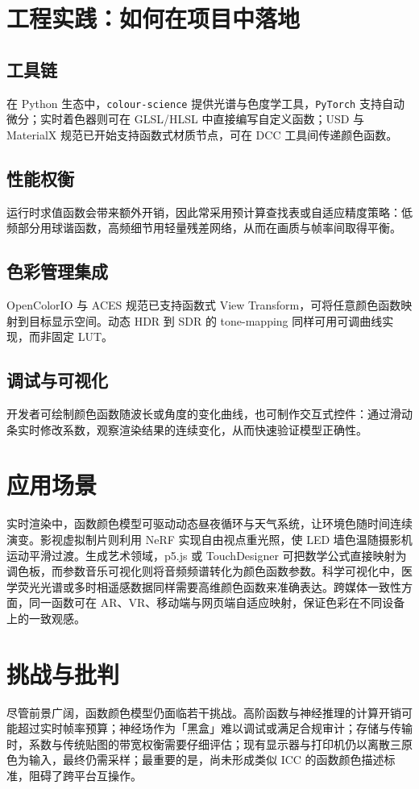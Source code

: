 \chapter{工程实践：如何在项目中落地}
\section{工具链}
在 Python 生态中，\texttt{colour-science} 提供光谱与色度学工具，\texttt{PyTorch} 支持自动微分；实时着色器则可在 GLSL/HLSL 中直接编写自定义函数；USD 与 MaterialX 规范已开始支持函数式材质节点，可在 DCC 工具间传递颜色函数。\par
\section{性能权衡}
运行时求值函数会带来额外开销，因此常采用预计算查找表或自适应精度策略：低频部分用球谐函数，高频细节用轻量残差网络，从而在画质与帧率间取得平衡。\par
\section{色彩管理集成}
OpenColorIO 与 ACES 规范已支持函数式 View Transform，可将任意颜色函数映射到目标显示空间。动态 HDR 到 SDR 的 tone-mapping 同样可用可调曲线实现，而非固定 LUT。\par
\section{调试与可视化}
开发者可绘制颜色函数随波长或角度的变化曲线，也可制作交互式控件：通过滑动条实时修改系数，观察渲染结果的连续变化，从而快速验证模型正确性。\par
\chapter{应用场景}
实时渲染中，函数颜色模型可驱动动态昼夜循环与天气系统，让环境色随时间连续演变。影视虚拟制片则利用 NeRF 实现自由视点重光照，使 LED 墙色温随摄影机运动平滑过渡。生成艺术领域，p5.js 或 TouchDesigner 可把数学公式直接映射为调色板，而参数音乐可视化则将音频频谱转化为颜色函数参数。科学可视化中，医学荧光光谱或多时相遥感数据同样需要高维颜色函数来准确表达。跨媒体一致性方面，同一函数可在 AR、VR、移动端与网页端自适应映射，保证色彩在不同设备上的一致观感。\par
\chapter{挑战与批判}
尽管前景广阔，函数颜色模型仍面临若干挑战。高阶函数与神经推理的计算开销可能超过实时帧率预算；神经场作为「黑盒」难以调试或满足合规审计；存储与传输时，系数与传统贴图的带宽权衡需要仔细评估；现有显示器与打印机仍以离散三原色为输入，最终仍需采样；最重要的是，尚未形成类似 ICC 的函数颜色描述标准，阻碍了跨平台互操作。\par
